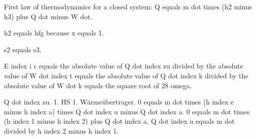 First law of thermodynamics for a closed system: 
Q equals m dot times (h2 minus h3) plus Q dot minus W dot.

h2 equals hfg because x equals 1.

s2 equals s3.

E index i c equals the absolute value of Q dot index zu divided by the absolute value of W dot index t equals the absolute value of Q dot index k divided by the absolute value of W dot k equals the square root of 28 omega.

Q dot index zu. 1. HS 1. Wärmeübertrager.
0 equals m dot times (h index e minus h index a) times Q dot index u minus Q dot index a.
0 equals m dot times (h index 1 minus h index 2) plus Q dot index a.
Q dot index u equals m dot divided by h index 2 minus h index 1.